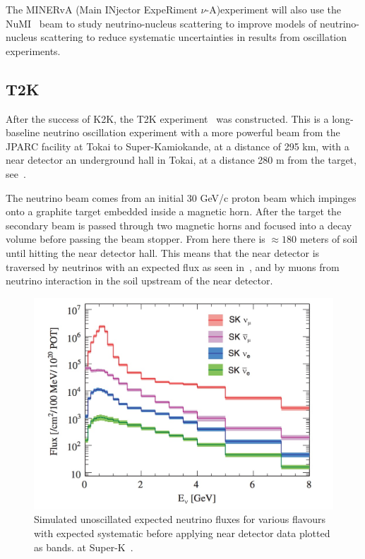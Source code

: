 The MINERvA (Main INjector ExpeRiment $\nu$-A)experiment \cite{39minerva} will also use the NuMI~\cite{19NuMI} beam to study neutrino-nucleus scattering to improve models of neutrino-nucleus scattering to reduce systematic uncertainties in results from oscillation experiments.


\subsection{T2K}


After the success of K2K, the T2K experiment~\cite{21T2K} was constructed. This is a long-baseline neutrino oscillation experiment with a more powerful beam from the JPARC facility at Tokai to Super-Kamiokande, at a distance of 295 km, with a near detector an underground hall in Tokai, at a distance 280 m from the target, see~.

The neutrino beam comes from an initial 30 GeV/c proton beam which impinges onto a graphite target embedded inside a magnetic horn. After the target the secondary beam is passed through two magnetic horns and focused into a decay volume before passing the beam stopper. From here there is $\approx180$ meters of soil until hitting the near detector hall. This means that the near detector is traversed by neutrinos with an expected flux as seen in~, and by muons from neutrino interaction in the soil upstream of the near detector. 

\begin{figure}[h!]
\centering
  \centering
\includegraphics[width=\textwidth]{figures/ND280Flux.jpeg}
\vspace{2mm}
\caption{Simulated unoscillated expected neutrino fluxes for various flavours with expected systematic before applying near detector data plotted as bands. at Super-K~\cite{21T2K}.}
\label{fig:ND280Flux}
\end{figure}


